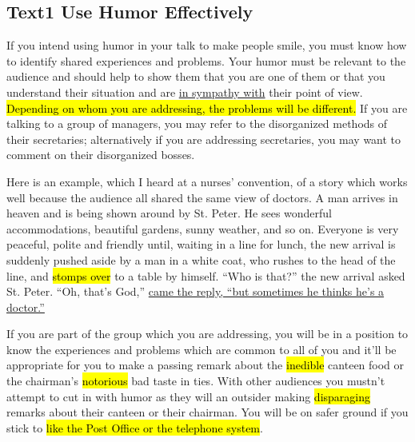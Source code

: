 \subsection{Text1 Use Humor Effectively} 
If you intend using humor in your talk to make people smile, you must know how to identify shared experiences and problems. Your humor must be relevant to the audience and should help to show them that you are one of them or that you understand their situation and are 
\underline{in sympathy with} 
their point of view. 
\hl{Depending on whom you are addressing, the problems will be different. }
If you are talking to a group of managers, you may refer to the disorganized methods of their secretaries; alternatively if you are addressing secretaries, you may want to comment on their disorganized bosses.

Here is an example, which I heard at a nurses’ convention, of a story which works well because the audience all shared the same view of doctors. A man arrives in heaven and is being shown around by St. Peter. He sees wonderful accommodations, beautiful gardens, sunny weather, and so on. Everyone is very peaceful, polite and friendly until, waiting in a line for lunch, the new arrival is suddenly pushed aside by a man in a white coat, who rushes to the head of the line, 
 and 
\hl{stomps over}
 to a table by himself. “Who is that?” the new arrival asked St. Peter. 
“Oh, that’s God,” 
\underline{came the reply, “but sometimes he thinks he’s a doctor.”}

If you are part of the group which you are addressing, you will be in a position to know the experiences and problems which are common to all of you and it’ll be appropriate for you to make a passing remark about the 
   \hl{inedible}
canteen food or the chairman’s 
 \hl{notorious}
bad taste in ties. With other audiences you mustn’t attempt to cut in with humor as they will 
an outsider making 
\hl{disparaging} 
remarks about their canteen or their chairman. You will be on safer ground if you stick to 
\hl{like the Post Office or the telephone system}.

